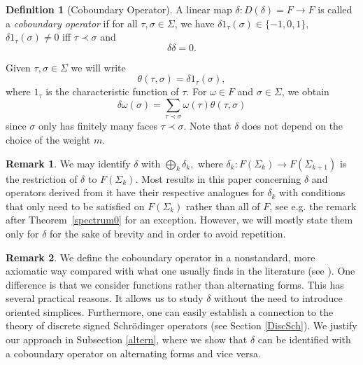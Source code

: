 \documentclass[10pt]{amsart}
\theoremstyle{definition}
\newtheorem{definition}[theorem]{Definition}
\newtheorem*{remark}{Remark}
\newcommand{\F}{{F}}
\begin{document}
\begin{definition}[Coboundary Operator]\label{coboundary}
    A linear map $\delta:D(\delta)=\F\rightarrow \F$ is called a \textit{coboundary operator} if for all $\tau,\sigma\in\Sigma$, we have $\delta 1_\tau(\sigma)\in\lbrace -1,0,1\rbrace,$ $\delta 1_\tau(\sigma)\neq 0$ iff $\tau\prec\sigma$ and 
     $$\delta\delta = 0.$$
\end{definition}
Given $\tau,\sigma\in \Sigma$ we will write
\begin{equation*}
	\theta(\tau,\sigma)=\delta1_\tau(\sigma),
\end{equation*}
where $1_{\tau}$ is the characteristic function of $\tau$. For $\omega\in \F$ and $\sigma\in \Sigma$, we obtain
 $$\delta\omega(\sigma) = \sum_{\tau\prec\sigma}\omega(\tau)\theta(\tau,\sigma)$$
since $\sigma$ only has finitely many faces $\tau\prec\sigma$. Note that $\delta$ does not depend on the choice of the weight $m.$


\begin{remark}
    We may identify $\delta$ with $\bigoplus_k\delta_k,$ where $\delta_k:\F(\Sigma_k)\rightarrow \F(\Sigma_{k+1})$ is the restriction of $\delta$ to $\F(\Sigma_k).$ Most results in this paper concerning $\delta$ and operators derived from it have their respective analogues for $\delta_k$ with conditions that only need to be satisfied on $ \F(\Sigma_k)$ rather than all of $\F$, see e.g. the remark after Theorem~\ref{spectrum0} for an exception. However, we will mostly state them only for $\delta$ for the sake of brevity and in order to avoid repetition. %
\end{remark}

\begin{remark}
    We define the coboundary operator in a nonstandard, more axiomatic way compared with what one usually finds in the literature (see \cite{GundertWagner,HJ,HL,Parzanchevski}). One difference is that we consider functions rather than alternating forms. This has several practical reasons. It allows us to study $\delta$ without the need to introduce oriented simplices. Furthermore, one can easily establish a connection to the theory of discrete signed Schrödinger operators (see Section \ref{DiscSch}). We justify our approach in Subsection \ref{altern}, where we show that $\delta$ can be identified with a coboundary operator on alternating forms and vice versa.  
\end{remark}
\end{document}
